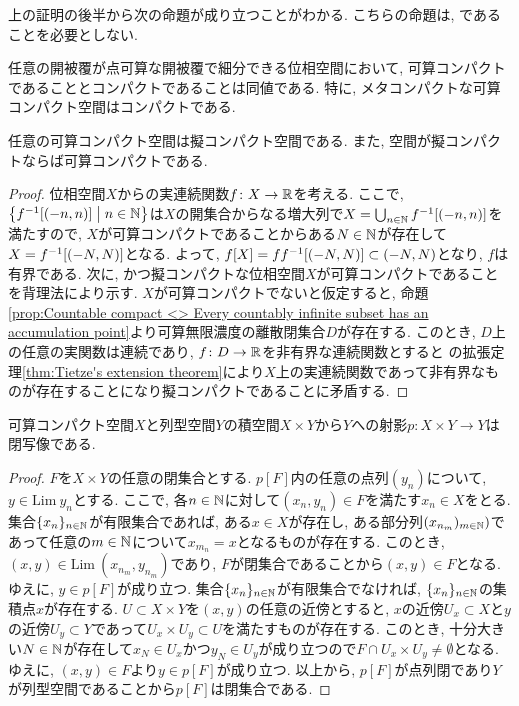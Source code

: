 \documentclass[uplatex, dvipdfmx, a4paper, 12pt, class=jsbook, crop=false]{standalone}
\begin{document}
上の証明の後半から次の命題が成り立つことがわかる.
こちらの命題は,  であることを必要としない.
\begin{proposition}
	\label{cpt00001}
	任意の開被覆が点可算な開被覆で細分できる位相空間において,
	可算コンパクトであることとコンパクトであることは同値である.
	特に, メタコンパクトな可算コンパクト空間はコンパクトである.
\end{proposition}

\begin{proposition}
	任意の可算コンパクト空間は擬コンパクト空間である. また,  空間が擬コンパクトならば可算コンパクトである.
\end{proposition}
\begin{proof}
	位相空間$ X $からの実連続関数$ f \colon X \to \mathbb{R} $を考える. ここで, $ \setcomp{f^{-1}[\intoo{-n}{n}]}{n \in \N} $は$ X $の開集合からなる増大列で$ X = \bigcup_{n \in \mathbb{N}} f^{-1}[\left( -n , n \right)] $を満たすので, $ X $が可算コンパクトであることからある$ N \in \mathbb{N} $が存在して$ X = f^{-1}[\left( -N , N \right)] $となる. よって, $ f[X] = ff^{-1}[\left( -N , N \right)] \subset \left( -N , N \right) $となり, $ f $は有界である. 次に,  かつ擬コンパクトな位相空間$ X $が可算コンパクトであることを背理法により示す. $ X $が可算コンパクトでないと仮定すると, 命題\ref{prop:Countable compact <> Every countably infinite subset has an accumulation point}より可算無限濃度の離散閉集合$ D $が存在する. このとき, $ D $上の任意の実関数は連続であり, $ f \colon D \to \mathbb{R} $を非有界な連続関数とすると \Tietze の拡張定理\ref{thm:Tietze's extension theorem}により$ X $上の実連続関数であって非有界なものが存在することになり擬コンパクトであることに矛盾する.
\end{proof}

\begin{proposition}
	\label{prop:The projection from the Cartesian product of a countably compact space X and a sequential space Y to Y is closed}
	可算コンパクト空間$ X $と列型空間$ Y $の積空間$ X \times Y $から$ Y $への射影$ p \colon X \times Y \to Y $は閉写像である.
\end{proposition}

\begin{proof}
	$ F $を$ X \times Y $の任意の閉集合とする. $ p[F] $内の任意の点列$ (y_n) $について, $ y \in \mathrm{Lim} \ y_n $とする. ここで, 各$ n \in \mathbb{N} $に対して$ (x_n, y_n) \in F $を満たす$ x_n \in X $をとる. 集合$ \{x_n \}_{n \in \mathbb{N}} $が有限集合であれば, ある$ x \in X $が存在し, ある部分列$ (x_{n_m})_{m \in \mathbb{N}}) $であって任意の$ m \in \mathbb{N} $について$ x_{m_n} = x $となるものが存在する. このとき, $ (x, y) \in \mathrm{Lim} \ (x_{n_m}, y_{n_m}) $であり, $ F $が閉集合であることから$ (x, y) \in F $となる. ゆえに, $ y \in p[F] $が成り立つ. 集合$ \{x_n \}_{n \in \mathbb{N}} $が有限集合でなければ, $ \{x_n \}_{n \in \mathbb{N}} $の集積点$ x $が存在する. $ U \subset X \times Y $を$ (x, y) $の任意の近傍とすると, $ x $の近傍$ U_x \subset X $と$ y $の近傍$ U_y \subset Y $であって$ U_x \times U_y \subset U $を満たすものが存在する. このとき, 十分大きい$ N \in \mathbb{N} $が存在して$ x_N \in U_x $かつ$ y_N \in U_y $が成り立つので$ F \cap U_x \times U_y \neq \emptyset $となる. ゆえに, $ (x, y) \in F $より$ y \in p[F] $が成り立つ. 以上から, $ p[F] $が点列閉であり$ Y $が列型空間であることから$ p[F] $は閉集合である.
\end{proof}
\end{document}
